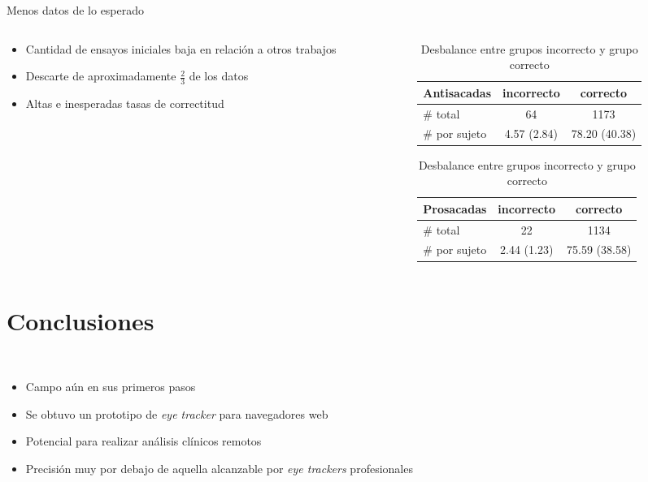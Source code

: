 \documentclass[aspectratio=169]{beamer}
\begin{document}
\begin{frame}{Menos datos de lo esperado}
  \begin{columns}
    \begin{column}{0.4\textwidth}
      \begin{itemize}
        \item Cantidad de ensayos iniciales baja en relación a otros trabajos
        \item Descarte de aproximadamente $\frac{2}{3}$ de los datos
        \item Altas e inesperadas tasas de correctitud
      \end{itemize}
    \end{column}

    \begin{column}{0.6\textwidth}
      \begin{table}
        \centering

        \begin{tabular}{ l | c | c }
          Antisacadas   & incorrecto  & correcto \\
          \hline
          \# total      & 64          & 1173 \\
          \hline
          \# por sujeto & 4.57 (2.84) & 78.20 (40.38)
        \end{tabular}

        \vspace{0.3cm}

        \begin{tabular}{ l | c | c }
          Prosacadas    & incorrecto  & correcto \\
          \hline
          \# total      & 22          & 1134 \\
          \hline
          \# por sujeto & 2.44 (1.23) & 75.59 (38.58)
        \end{tabular}

        \caption{Desbalance entre grupos incorrecto y grupo correcto}
      \end{table}
    \end{column}
  \end{columns}
\end{frame}

\section{Conclusiones}

\begin{frame}{~}
  \begin{itemize}
    \item Campo aún en sus primeros pasos
    \item Se obtuvo un prototipo de \textit{eye tracker} para navegadores web
    \item Potencial para realizar análisis clínicos remotos
    \item Precisión muy por debajo de aquella alcanzable por \textit{eye
      trackers} profesionales
  \end{itemize}
\end{frame}
\end{document}
